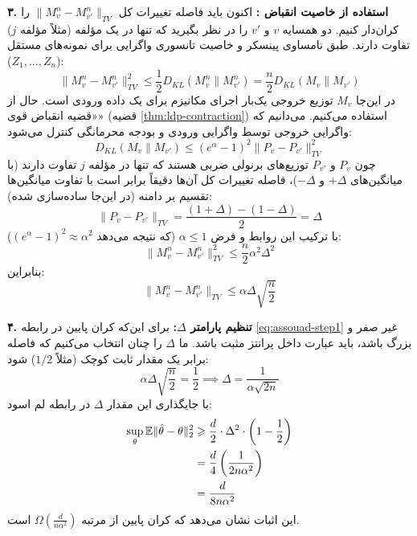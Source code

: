 \begin{اثبات}
\textbf{۳. استفاده از خاصیت انقباض :}
اکنون باید فاصله تغییرات کل $\|M_v^n - M_{v'}^n\|_{TV}$ را کران‌دار کنیم. دو همسایه $v$ و $v'$ را در نظر بگیرید که تنها در یک مؤلفه (مثلاً مؤلفه $j$) تفاوت دارند.
طبق نامساوی پینسکر و خاصیت تانسوری واگرایی  برای نمونه‌های مستقل ($Z_1, \dots, Z_n$):
\begin{equation}
\|M_v^n - M_{v'}^n\|_{TV}^2 \le \frac{1}{2} D_{KL}(M_v^n \| M_{v'}^n) = \frac{n}{2} D_{KL}(M_v \| M_{v'})
\end{equation}
در این‌جا $M_v$ توزیع خروجی یک‌بار اجرای مکانیزم برای یک داده ورودی است.
حال از «قضیه انقباض قوی» (قضیه \ref{thm:ldp-contraction}) استفاده می‌کنیم. می‌دانیم که واگرایی خروجی توسط واگرایی ورودی و بودجه محرمانگی کنترل می‌شود:
\begin{equation}
D_{KL}(M_v \| M_{v'}) \le (e^\alpha - 1)^2 \|P_v - P_{v'}\|_{TV}^2
\end{equation}
چون $P_v$ و $P_{v'}$ توزیع‌های برنولی ضربی هستند که تنها در مؤلفه $j$ تفاوت دارند (با میانگین‌های $+\Delta$ و $-\Delta$)، فاصله تغییرات کل آن‌ها دقیقاً برابر است با تفاوت میانگین‌ها تقسیم بر دامنه (در این‌جا ساده‌سازی شده):
\begin{equation}
\|P_v - P_{v'}\|_{TV} = \frac{(1+\Delta) - (1-\Delta)}{2} = \Delta
\end{equation}
با ترکیب این روابط و فرض $\alpha \le 1$ (که نتیجه می‌دهد $(e^\alpha - 1)^2 \approx \alpha^2$):
\begin{equation}
\|M_v^n - M_{v'}^n\|_{TV}^2 \le \frac{n}{2} \alpha^2 \Delta^2
\end{equation}
بنابراین:
\begin{equation}
\|M_v^n - M_{v'}^n\|_{TV} \le \alpha \Delta \sqrt{\frac{n}{2}}
\end{equation}

\textbf{۴. تنظیم پارامتر $\Delta$:}
برای این‌که کران پایین در رابطه \eqref{eq:assouad-step1} غیر صفر و بزرگ باشد، باید عبارت داخل پرانتز مثبت باشد. ما $\Delta$ را چنان انتخاب می‌کنیم که فاصله  برابر یک مقدار ثابت کوچک (مثلاً $1/2$) شود:
\begin{equation}
\alpha \Delta \sqrt{\frac{n}{2}} = \frac{1}{2} \implies \Delta = \frac{1}{\alpha \sqrt{2n}}
\end{equation}
با جایگذاری این مقدار $\Delta$ در رابطه لم اسود:
\begin{align}
\sup_{\theta} \Eset \|\hat{\theta} - \theta\|_2^2 &\ge \frac{d}{2} \cdot \Delta^2 \cdot \left( 1 - \frac{1}{2} \right) \nonumber \\
&= \frac{d}{4} \left( \frac{1}{2n \alpha^2} \right) \nonumber \\
&= \frac{d}{8 n \alpha^2}
\end{align}
این اثبات نشان می‌دهد که کران پایین از مرتبه $\Omega(\frac{d}{n \alpha^2})$ است.
\end{اثبات}

